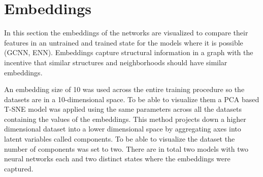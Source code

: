 \documentclass[
]{elteikthesis}[2023/04/10]
\begin{document}
\section{Embeddings}

In this section the embeddings of the networks are visualized to compare
their features in an untrained and trained state for the models where
it is possible (GCNN, ENN). Embeddings capture structural information
in a graph with the incentive that similar structures and neighborhoods
should have similar embeddings. 

An embedding size of 10 was used across the entire training procedure
so the datasets are in a 10-dimensional space. To be able to visualize
them a PCA based T-SNE model was applied using the same parameters
across all the datasets containing the values of the embeddings. This
method projects down a higher dimensional dataset into a lower dimensional
space by aggregating axes into latent variables called components.
To be able to visualize the dataset the number of components was set to two. 
There are in total two models with two neural networks each and two distinct 
states where the embeddings were captured.
\end{document}
